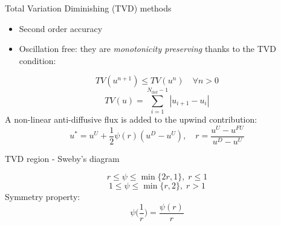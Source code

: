 \documentclass{beamer}
\begin{document}
\begin{frame}{Total Variation Diminishing (TVD) methods}
\begin{itemize}
	\item Second order accuracy
	\item Oscillation free: they are \emph{monotonicity preserving} thanks to 
	the TVD condition:
\end{itemize}
\vspace{0.3cm}
\begin{equation*}
	TV(u^{n+1}) \leq TV(u^n) \quad \forall n>0
\end{equation*}
\begin{equation*}
	TV(u) = 
	\sum_{i=1}^{N_\text{dof}-1} |u_{i+1} - u_i|
\end{equation*}
\vspace{0.3cm}
A non-linear anti-diffusive flux is added to the upwind contribution:
\begin{equation*}
u^* = u^U + \frac{1}{2} \psi(r)(u^D - u^U), \quad r = \frac{u^U - u^{FU}}{u^D 
- u^U}
\end{equation*}
\end{frame}
\begin{frame}{TVD region - Sweby's diagram}
\begin{minipage}[t]{0.63\textwidth}
\begin{figure}
	\centering
	\hspace{-1.24cm}
	
\end{figure}
\end{minipage}
\begin{minipage}[t]{0.35\textwidth}
	\vspace{1cm}
\begin{equation*}
	r \leq \psi \leq \min \{2r, 1\}, \; r\leq1
\end{equation*}
\begin{equation*}
	1 \leq \psi \leq \min \{r, 2\}, \; r>1
\end{equation*}
	Symmetry property:
	\begin{equation*}
	\psi\bigg(\frac{1}{r}\bigg) = \frac{\psi(r)}{r}
	\end{equation*}
\end{minipage}
\end{frame}
\end{document}
